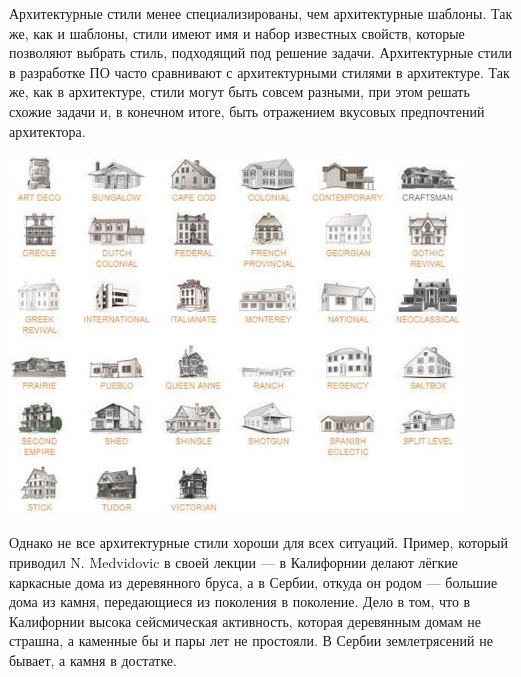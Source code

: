 \documentclass{../../text-style}
\begin{document}
\noindent\begin{minipage}{\textwidth}
    \begin{minipage}[c][6cm][c]{\dimexpr0.5\textwidth-0.5\Colsep\relax}
        Архитектурные стили менее специализированы, чем архитектурные шаблоны. Так же, как и шаблоны, стили имеют имя и набор известных свойств, которые позволяют выбрать стиль, подходящий под решение задачи. Архитектурные стили в разработке ПО часто сравнивают с архитектурными стилями в архитектуре. Так же, как в архитектуре, стили могут быть совсем разными, при этом решать схожие задачи и, в конечном итоге, быть отражением вкусовых предпочтений архитектора.
    \end{minipage}\hfill
    \begin{minipage}[c][6cm][c]{\dimexpr0.5\textwidth-0.5\Colsep\relax}
        \includegraphics[width=0.9\textwidth]{buildingStyles.png}
    \end{minipage}%
\end{minipage}

Однако не все архитектурные стили хороши для всех ситуаций. Пример, который приводил N. Medvidovic в своей лекции --- в Калифорнии делают лёгкие каркасные дома из деревянного бруса, а в Сербии, откуда он родом --- большие дома из камня, передающиеся из поколения в поколение. Дело в том, что в Калифорнии высока сейсмическая активность, которая деревянным домам не страшна, а каменные бы и пары лет не простояли. В Сербии землетрясений не бывает, а камня в достатке.
\end{document}
